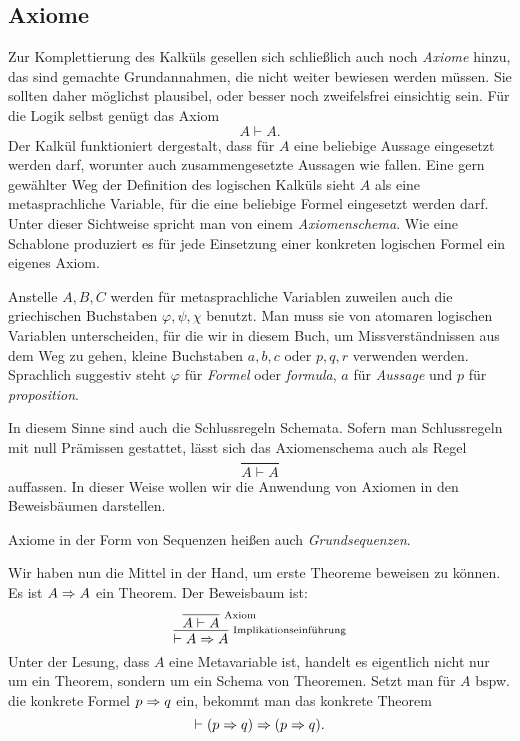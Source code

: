 \subsection{Axiome}

Zur Komplettierung des Kalküls gesellen sich schließlich auch noch
\emph{Axiome} hinzu, das sind gemachte Grundannahmen, die
nicht weiter bewiesen werden müssen. Sie sollten daher möglichst
plausibel, oder besser noch zweifelsfrei einsichtig sein. Für die Logik
selbst genügt das Axiom
\[A\vdash A.\]
Der Kalkül funktioniert dergestalt, dass für $A$ eine beliebige Aussage
eingesetzt werden darf, worunter auch zusammengesetzte Aussagen
wie fallen. Eine gern gewählter Weg der Definition des logischen
Kalküls sieht $A$ als eine metasprachliche Variable, für die eine
beliebige Formel eingesetzt werden darf. Unter dieser Sichtweise
spricht man von einem \emph{Axiomenschema}. Wie
eine Schablone produziert es für jede Einsetzung einer konkreten
logischen Formel ein eigenes Axiom.

Anstelle $A,B,C$ werden für metasprachliche Variablen zuweilen auch
die griechischen Buchstaben $\varphi,\psi,\chi$ benutzt. Man muss sie
von atomaren logischen Variablen unterscheiden, für die wir in diesem
Buch, um Missverständnissen aus dem Weg zu gehen, kleine Buchstaben
$a,b,c$ oder $p,q,r$ verwenden werden. Sprachlich suggestiv steht
$\varphi$ für \emph{Formel} oder \emph{formula}, $a$ für
\emph{Aussage} und $p$ für \emph{proposition}.

In diesem Sinne sind auch die Schlussregeln Schemata. Sofern man
Schlussregeln mit null Prämissen gestattet, lässt sich das
Axiomenschema auch als Regel
\[\dfrac{}{A\vdash A}\]
auffassen. In dieser Weise wollen wir die Anwendung von Axiomen in den
Beweisbäumen darstellen.

Axiome in der Form von Sequenzen heißen auch
\emph{Grundsequenzen}.

Wir haben nun die Mittel in der Hand, um erste Theoreme beweisen
zu können. Es ist $A\Rightarrow A$ ein Theorem. Der Beweisbaum ist:
\[
\infer[\infernote{Implikationseinführung}]{\vdash A\cond A}{
  \infer[\infernote{Axiom}]{A\vdash A}{}}
\]
Unter der Lesung, dass $A$ eine Metavariable ist, handelt es
eigentlich nicht nur um ein Theorem, sondern um ein Schema von
Theoremen. Setzt man für $A$ bspw. die konkrete
Formel $p\Rightarrow q$ ein, bekommt man das konkrete Theorem
\[\vdash (p\Rightarrow q)\Rightarrow (p\Rightarrow q).\]

